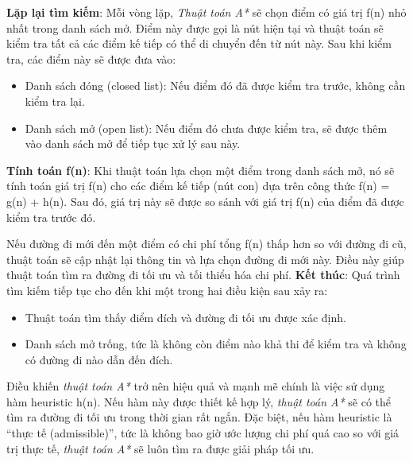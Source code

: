 \documentclass{article}
\begin{document}
\textbf{Lặp lại tìm kiếm}:
Mỗi vòng lặp, \textit{Thuật toán A*} sẽ chọn điểm có giá trị f(n) nhỏ nhất trong danh sách mở. Điểm này được gọi là nút hiện tại và thuật toán sẽ kiểm tra tất cả các điểm kế tiếp có thể di chuyển đến từ nút này. Sau khi kiểm tra, các điểm này sẽ được đưa vào:
\begin{itemize}
    \item Danh sách đóng (closed list): Nếu điểm đó đã được kiểm tra trước, không cần kiểm tra lại.
    \item Danh sách mở (open list): Nếu điểm đó chưa được kiểm tra, sẽ được thêm vào danh sách mở để tiếp tục xử lý sau này.
\end{itemize}

\textbf{Tính toán f(n)}:
Khi thuật toán lựa chọn một điểm trong danh sách mở, nó sẽ tính toán giá trị f(n) cho các điểm kế tiếp (nút con) dựa trên công thức f(n) = g(n) + h(n). Sau đó, giá trị này sẽ được so sánh với giá trị f(n) của điểm đã được kiểm tra trước đó.

Nếu đường đi mới đến một điểm có chi phí tổng f(n) thấp hơn so với đường đi cũ, thuật toán sẽ cập nhật lại thông tin và lựa chọn đường đi mới này. Điều này giúp thuật toán tìm ra đường đi tối ưu và tối thiểu hóa chi phí.
\textbf{Kết thúc}:
Quá trình tìm kiếm tiếp tục cho đến khi một trong hai điều kiện sau xảy ra:
\begin{itemize}
    \item Thuật toán tìm thấy điểm đích và đường đi tối ưu được xác định.
    \item Danh sách mở trống, tức là không còn điểm nào khả thi để kiểm tra và không có đường đi nào dẫn đến đích.
\end{itemize}
Điều khiến \textit{thuật toán A*} trở nên hiệu quả và mạnh mẽ chính là việc sử dụng hàm heuristic h(n). Nếu hàm này được thiết kế hợp lý, \textit{thuật toán A*} sẽ có thể tìm ra đường đi tối ưu trong thời gian rất ngắn. Đặc biệt, nếu hàm heuristic là “thực tế (admissible)”, tức là không bao giờ ước lượng chi phí quá cao so với giá trị thực tế, \textit{thuật toán A*} sẽ luôn tìm ra được giải pháp tối ưu.
\end{document}
